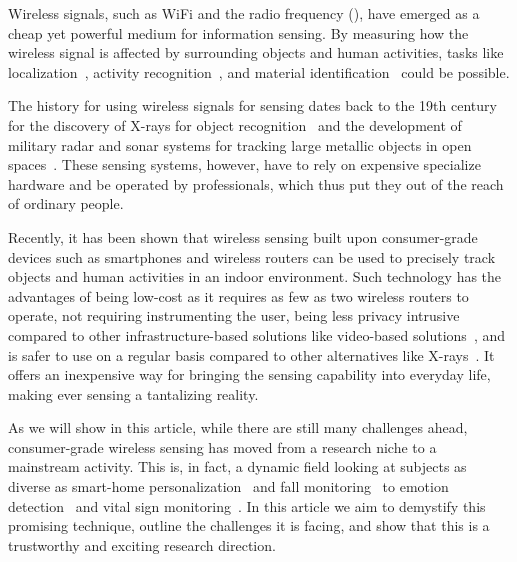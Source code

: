 Wireless signals, such as WiFi and the radio frequency (\RF), have emerged as a cheap yet powerful medium for information sensing. By
measuring how the wireless signal is affected by surrounding objects and human activities, tasks like localization~\cite{Arraytrack,
Tagoram}, activity recognition~\cite{Wang2015Understanding, wang2016human}, and material identification~\cite{Tagscan, LiquID, zhao2018rf}
could be possible.


The history for using wireless signals for sensing dates back to the 19th century  for the discovery of X-rays for object
recognition~\cite{Suzuki1996} and the development of military radar and sonar systems for tracking large metallic objects in open
spaces~\cite{}. These sensing systems, however, have to rely on expensive specialize hardware and be operated by professionals, which thus
put they out of the reach of ordinary people.


Recently, it has been shown that wireless sensing built upon consumer-grade devices such as smartphones and wireless routers can be used to
precisely track objects and human activities in an indoor environment. Such technology has the advantages of being low-cost as it requires
as few as two wireless routers to operate, not requiring instrumenting the user, being less privacy intrusive compared to other
infrastructure-based solutions like video-based solutions~\cite{Cruz2015Quantification}, and is safer to use on a regular basis compared to
other alternatives like X-rays~\cite{De2013B}. It offers an inexpensive way for bringing the sensing capability into everyday life, making
ever sensing a tantalizing reality.

As we will show in this article, while there are still many challenges ahead, consumer-grade wireless sensing has moved from a research
niche to a mainstream activity. This is, in fact, a dynamic field looking at subjects as diverse as smart-home personalization~\cite{} and
fall monitoring~\cite{} to emotion detection~\cite{} and vital sign monitoring~\cite{}. In this article we aim to demystify this promising
technique, outline the challenges it is facing, and show that this is a trustworthy and exciting research direction.







